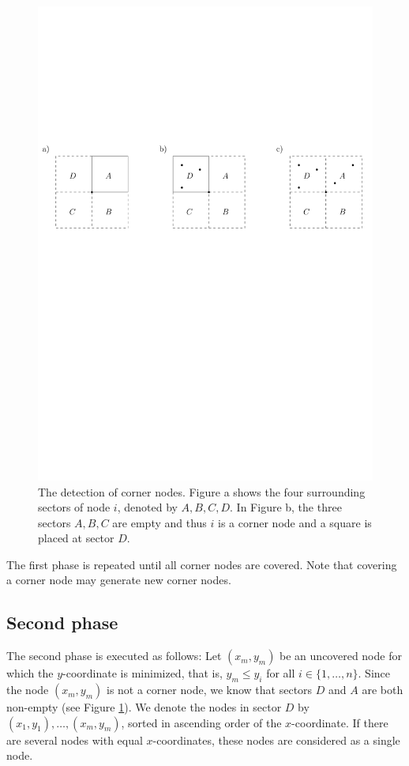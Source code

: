 \documentclass{article}
\begin{document}
\begin{figure}[ht]
\begin{center}
\includegraphics[width=0.9\columnwidth]{sectors01}
\caption{The detection of corner nodes. Figure a shows the four surrounding
sectors of node $i$, denoted by $A,B,C,D$. In Figure b, the three sectors $A,B,C$
are empty and thus $i$ is a corner node and a square is placed at sector $D$.}
\label{sectors01}
\end{center}
\end{figure}


The first phase is repeated until all corner nodes are covered. Note that 
covering a corner node may generate new corner nodes.

\subsection{Second phase}
The second phase is executed as follows: Let $(x_m,y_m)$ be an uncovered node for which
the $y$-coordinate is minimized, that is, $y_m \leq y_i$ for all $i \in \{1,\ldots,n\}$.
Since the node $(x_m,y_m)$ is not a corner node, we know that sectors $D$ and $A$ are both non-empty 
(see Figure \ref{sectors01}). We denote the nodes in sector $D$ by 
$(x_1,y_1),\ldots,(x_{m},y_{m})$, sorted in ascending order of the $x$-coordinate. 
If there are several nodes with equal $x$-coordinates, these nodes are considered as a single node.
\end{document}
